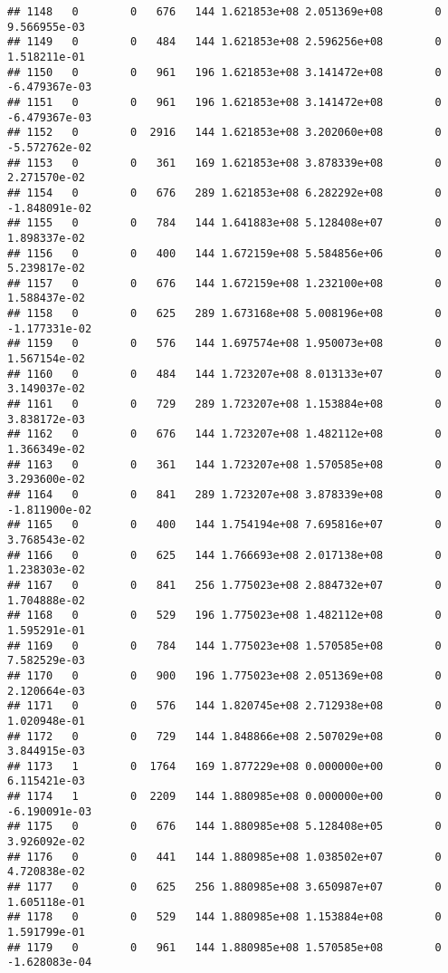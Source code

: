 \documentclass[
]{article}
\begin{document}
\begin{enumerate}
\begin{verbatim}
## 1148   0        0   676   144 1.621853e+08 2.051369e+08        0  9.566955e-03
## 1149   0        0   484   144 1.621853e+08 2.596256e+08        0  1.518211e-01
## 1150   0        0   961   196 1.621853e+08 3.141472e+08        0 -6.479367e-03
## 1151   0        0   961   196 1.621853e+08 3.141472e+08        0 -6.479367e-03
## 1152   0        0  2916   144 1.621853e+08 3.202060e+08        0 -5.572762e-02
## 1153   0        0   361   169 1.621853e+08 3.878339e+08        0  2.271570e-02
## 1154   0        0   676   289 1.621853e+08 6.282292e+08        0 -1.848091e-02
## 1155   0        0   784   144 1.641883e+08 5.128408e+07        0  1.898337e-02
## 1156   0        0   400   144 1.672159e+08 5.584856e+06        0  5.239817e-02
## 1157   0        0   676   144 1.672159e+08 1.232100e+08        0  1.588437e-02
## 1158   0        0   625   289 1.673168e+08 5.008196e+08        0 -1.177331e-02
## 1159   0        0   576   144 1.697574e+08 1.950073e+08        0  1.567154e-02
## 1160   0        0   484   144 1.723207e+08 8.013133e+07        0  3.149037e-02
## 1161   0        0   729   289 1.723207e+08 1.153884e+08        0  3.838172e-03
## 1162   0        0   676   144 1.723207e+08 1.482112e+08        0  1.366349e-02
## 1163   0        0   361   144 1.723207e+08 1.570585e+08        0  3.293600e-02
## 1164   0        0   841   289 1.723207e+08 3.878339e+08        0 -1.811900e-02
## 1165   0        0   400   144 1.754194e+08 7.695816e+07        0  3.768543e-02
## 1166   0        0   625   144 1.766693e+08 2.017138e+08        0  1.238303e-02
## 1167   0        0   841   256 1.775023e+08 2.884732e+07        0  1.704888e-02
## 1168   0        0   529   196 1.775023e+08 1.482112e+08        0  1.595291e-01
## 1169   0        0   784   144 1.775023e+08 1.570585e+08        0  7.582529e-03
## 1170   0        0   900   196 1.775023e+08 2.051369e+08        0  2.120664e-03
## 1171   0        0   576   144 1.820745e+08 2.712938e+08        0  1.020948e-01
## 1172   0        0   729   144 1.848866e+08 2.507029e+08        0  3.844915e-03
## 1173   1        0  1764   169 1.877229e+08 0.000000e+00        0  6.115421e-03
## 1174   1        0  2209   144 1.880985e+08 0.000000e+00        0 -6.190091e-03
## 1175   0        0   676   144 1.880985e+08 5.128408e+05        0  3.926092e-02
## 1176   0        0   441   144 1.880985e+08 1.038502e+07        0  4.720838e-02
## 1177   0        0   625   256 1.880985e+08 3.650987e+07        0  1.605118e-01
## 1178   0        0   529   144 1.880985e+08 1.153884e+08        0  1.591799e-01
## 1179   0        0   961   144 1.880985e+08 1.570585e+08        0 -1.628083e-04

\end{verbatim}
\end{enumerate}
\end{document}

